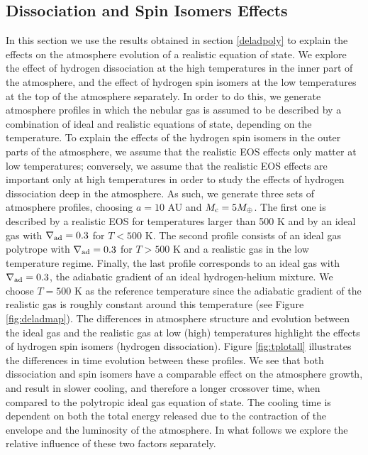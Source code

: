 \documentclass[apj]{emulateapj}
\newcommand{\delad}{\nabla_{\rm ad}}
\newcommand{\co}{_{\rm c}}
\begin{document}

\subsection{Dissociation and Spin Isomers Effects}
\label{deladeffect}

In this section we use the results obtained in section \ref{deladpoly} to explain the effects on the atmosphere evolution of a realistic equation of state. We explore the effect of hydrogen dissociation at the high temperatures in the inner part of the atmosphere, and the effect of hydrogen spin isomers at the low temperatures at the top of the atmosphere separately. In order to do this, we generate atmosphere profiles in which the nebular gas is assumed to be described by a combination of ideal and realistic equations of state, depending on the temperature. To explain the effects of the hydrogen spin isomers in the outer parts of the atmosphere, we assume that the realistic EOS effects only matter at low temperatures; conversely, we assume that the realistic EOS effects are important only at high temperatures in order to study the effects of hydrogen dissociation deep in the atmosphere. As such, we generate three sets of atmosphere profiles, choosing $a=10$ AU and $M\co=5 M_{\oplus}$. The first one is described by a realistic EOS for temperatures larger than 500 K and by an ideal gas with $\delad=0.3$ for $T<500$ K. The second profile consists of an ideal gas polytrope with $\delad=0.3$ for $T>500$ K and a realistic gas in the low temperature regime. Finally, the last profile corresponds to an ideal gas with $\delad=0.3$, the adiabatic gradient of an ideal hydrogen-helium mixture.  We choose $T=500$ K as the reference temperature since the adiabatic gradient of the realistic gas is roughly constant around this temperature (see Figure \ref{fig:deladmap}). The differences in atmosphere structure and evolution between the ideal gas and the realistic gas at low (high) temperatures highlight the effects of hydrogen spin isomers (hydrogen dissociation). Figure \ref{fig:tplotall} illustrates the differences in time evolution between these profiles. We see that both dissociation and spin isomers have a comparable effect on the atmosphere growth, and result in slower cooling, and therefore a longer crossover time, when compared to the polytropic ideal gas equation of state. The cooling time is dependent on both the total energy released due to the contraction of the envelope and the luminosity of the atmosphere. In what follows we explore the relative influence of these two factors separately.
\end{document}
